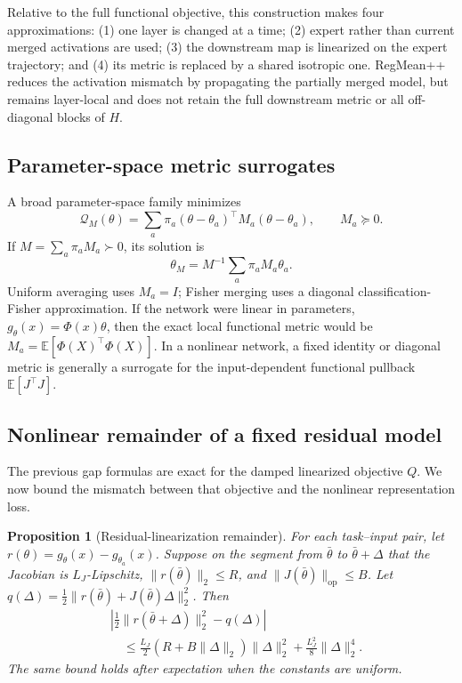 \documentclass[letterpaper]{article} %
\theoremstyle{plain}
\newtheorem{proposition}[theorem]{Proposition}
\theoremstyle{definition}
\begin{document}
Relative to the full functional objective, this construction makes four approximations: (1) one layer is changed at a time; (2) expert rather than current merged activations are used; (3) the downstream map is linearized on the expert trajectory; and (4) its metric is replaced by a shared isotropic one.
RegMean++ reduces the activation mismatch by propagating the partially merged model, but remains layer-local and does not retain the full downstream metric or all off-diagonal blocks of $H$.

\subsection{Parameter-space metric surrogates}
\label{app:parameter-metrics}

A broad parameter-space family minimizes
\begin{equation}
\mathcal Q_M(\theta)=
\sum_a\pi_a(\theta-\theta_a)^\top M_a(\theta-\theta_a),
\qquad M_a\succeq0.
\label{eq:parameter-metric}
\end{equation}
If $M=\sum_a\pi_aM_a\succ0$, its solution is
\begin{equation}
\theta_M=M^{-1}\sum_a\pi_aM_a\theta_a.
\label{eq:parameter-metric-solution}
\end{equation}
Uniform averaging uses $M_a=I$; Fisher merging uses a diagonal classification-Fisher approximation.
If the network were linear in parameters, $g_\theta(x)=\Phi(x)\theta$, then the exact local functional metric would be $M_a=\mathbb E[\Phi(X)^\top\Phi(X)]$.
In a nonlinear network, a fixed identity or diagonal metric is generally a surrogate for the input-dependent functional pullback $\mathbb E[J^\top J]$.

\subsection{Nonlinear remainder of a fixed residual model}
\label{app:nonlinear}

The previous gap formulas are exact for the damped linearized objective $Q$.
We now bound the mismatch between that objective and the nonlinear representation loss.

\begin{proposition}[Residual-linearization remainder]
\label{prop:nonlinear-remainder}
For each task--input pair, let $r(\theta)=g_\theta(x)-g_{\theta_a}(x)$.
Suppose on the segment from $\bar\theta$ to $\bar\theta+\Delta$ that the Jacobian is $L_J$-Lipschitz, $\|r(\bar\theta)\|_2\le R$, and $\|J(\bar\theta)\|_{\mathrm{op}}\le B$.
Let $q(\Delta)=\frac12\|r(\bar\theta)+J(\bar\theta)\Delta\|_2^2$.
Then
\begin{align}
&\left|
\frac12\|r(\bar\theta+\Delta)\|_2^2-q(\Delta)
\right| \\
&\quad\le
\frac{L_J}{2}(R+B\|\Delta\|_2)\|\Delta\|_2^2
+\frac{L_J^2}{8}\|\Delta\|_2^4.
\label{eq:nonlinear-remainder}
\end{align}
The same bound holds after expectation when the constants are uniform.
\end{proposition}
\end{document}
